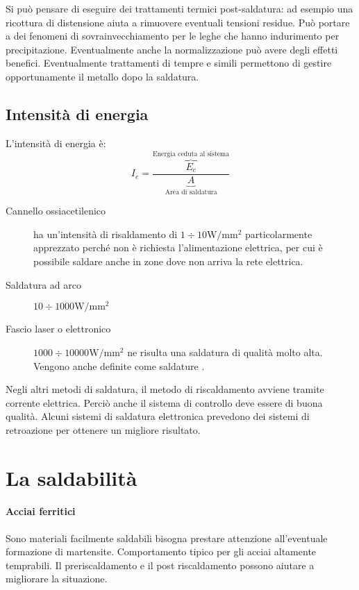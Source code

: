 Si può pensare di eseguire dei trattamenti termici post-saldatura: ad esempio una ricottura di distensione aiuta a rimuovere eventuali tensioni residue. Può portare a dei fenomeni di sovrainvecchiamento per le leghe che hanno indurimento per precipitazione.
Eventualmente anche la normalizzazione può avere degli effetti benefici.
Eventualmente trattamenti di tempre e simili permettono di gestire opportunamente il metallo dopo la saldatura.

\subsection{Intensità di energia}
L'intensità di energia è:
\begin{equation}
I_e = \frac{\overbrace{E_c}^{\text{Energia ceduta al sistema}}}{\underbrace{A}_{\text{Area di saldatura}}}
\end{equation}

\begin{description}
\item[Cannello ossiacetilenico] ha un'intensità di risaldamento di $1 \div 10 \unit{\W/\mm^2}$ particolarmente apprezzato perché non è richiesta l'alimentazione elettrica, per cui è possibile saldare anche in zone dove non arriva la rete elettrica.
\item[Saldatura ad arco] $10 \div 1000 \unit{\W/\mm^2}$
\item[Fascio laser o elettronico] $1000 \div 10000 \unit{\W/\mm^2}$ ne risulta una saldatura di qualità molto alta. Vengono anche definite come saldature .
\end{description}

Negli altri metodi di saldatura, il metodo di riscaldamento avviene tramite corrente elettrica. Perciò anche il sistema di controllo deve essere di buona qualità. Alcuni sistemi di saldatura elettronica prevedono dei sistemi di retroazione per ottenere un migliore risultato.

\section{La saldabilità}
\paragraph{Acciai ferritici} Sono materiali facilmente saldabili bisogna prestare attenzione all'eventuale formazione di martensite. Comportamento tipico per gli acciai altamente temprabili.
Il preriscaldamento e il post riscaldamento possono aiutare a migliorare la situazione.
